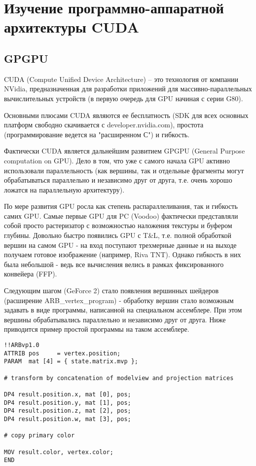 \section{Изучение  программно-аппаратной архитектуры CUDA}
\subsection{GPGPU}
CUDA (Compute Unified Device Architecture) -- это технология от компании NVidia, предназначенная для разработки приложений для массивно-параллельных вычислительных устройств (в первую очередь для GPU начиная с серии G80).

Основными плюсами CUDA являются ее бесплатность (SDK для всех основных платформ свободно скачивается с developer.nvidia.com), простота (программирование ведется на "расширенном С") и гибкость.

Фактически CUDA является дальнейшим развитием GPGPU (General Purpose computation on GPU). Дело в том, что уже с самого начала GPU активно использовали параллельность (как вершины, так и отдельные фрагменты могут обрабатываться параллельно и независимо друг от друга, т.е. очень хорошо ложатся на параллельную архитектуру).

По мере развития GPU росла как степень распараллеливания, так и гибкость самих GPU. Самые первые GPU для PC (Voodoo) фактически представляли собой просто растеризатор с возможностью наложения текстуры и буфером глубины. Довольно быстро появились GPU с T\&L, т.е. полной обработкой вершин на самом GPU - на вход поступают трехмерные данные и на выходе получаем готовое изображение (например, Riva TNT). Однако гибкость в них была небольшой - ведь все вычисления велись в рамках фиксированного конвейера (FFP).

Следующим шагом (GeForce 2) стало появления вершинных шейдеров (расширение ARB\_ver\-tex\_prog\-ram) - обработку вершин стало возможным задавать в виде программы, написанной на специальном ассемблере. При этом вершины обрабатывались параллельно и независимо друг от друга. Ниже приводится пример простой программы на таком ассемблере.
\begin{verbatim}
!!ARBvp1.0
ATTRIB pos     = vertex.position;
PARAM  mat [4] = { state.matrix.mvp };

# transform by concatenation of modelview and projection matrices

DP4 result.position.x, mat [0], pos;
DP4 result.position.y, mat [1], pos;
DP4 result.position.z, mat [2], pos;
DP4 result.position.w, mat [3], pos;

# copy primary color
 
MOV result.color, vertex.color;
END
\end{verbatim}

